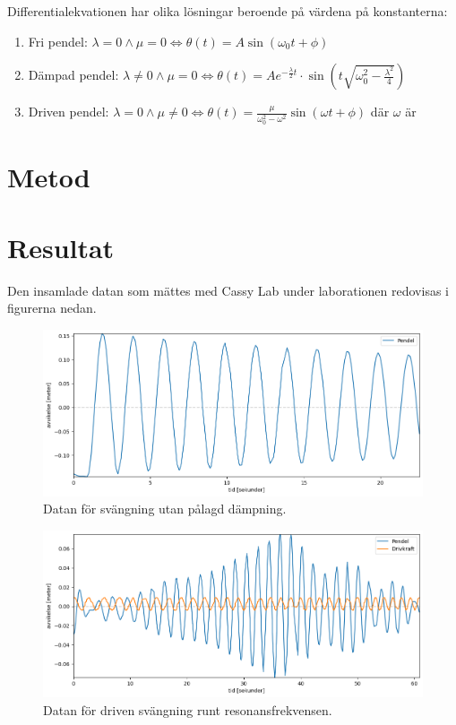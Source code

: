 \documentclass[12pt, a4paper]{article}
\begin{document}
Differentialekvationen har olika lösningar beroende på värdena på konstanterna:
\begin{enumerate}
    \item Fri pendel: $\lambda=0\land\mu=0\Leftrightarrow\theta(t)=A\sin(\omega_0 t+\phi)$
    \item Dämpad pendel: $\lambda\neq0\land\mu=0\Leftrightarrow\theta(t)=Ae^{-\frac{\lambda}{2}t}\cdot\sin(t\sqrt{\omega_0^2-\frac{\lambda^2}{4}})$
    \item Driven pendel: $\lambda=0\land\mu\neq0\Leftrightarrow\theta(t)=\frac{\mu}{\omega_0^2-\omega^2}\sin(\omega t+\phi)$ där $\omega$ är 
\end{enumerate}
\section{Metod}
\section{Resultat}

Den insamlade datan som mättes med Cassy Lab under laborationen redovisas i figurerna nedan. 

\begin{figure}[hp]
    \includegraphics[width=\textwidth]{graf_egenfrekvens}
    \caption{Datan för svängning utan pålagd dämpning.}
\end{figure}

\begin{figure}[hp]
    \includegraphics[width=\textwidth]{graf_resonansfrekvens}
    \caption{Datan för driven svängning runt resonansfrekvensen.}
\end{figure}
\end{document}
